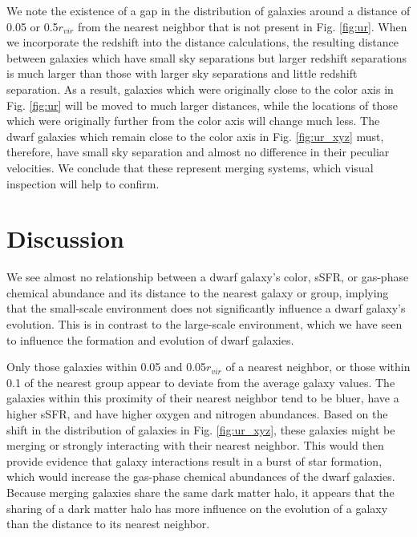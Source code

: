 We note the existence of a gap in the distribution of galaxies around a distance 
of 0.05 \hMpc or 0.5$r_{vir}$ from the nearest neighbor that is not present in 
Fig. \ref{fig:ur}.  When we incorporate the redshift into the distance 
calculations, the resulting distance between galaxies which have small sky 
separations but larger redshift separations is much larger than those with 
larger sky separations and little redshift separation.  As a result, galaxies 
which were originally close to the color axis in Fig. \ref{fig:ur} will be 
moved to much larger distances, while the locations of those which were 
originally further from the color axis will change much less.  The dwarf 
galaxies which remain close to the color axis in Fig. \ref{fig:ur_xyz} must, 
therefore, have small sky separation and almost no difference in their peculiar 
velocities.  We conclude that these represent merging systems, which visual 
inspection will help to confirm.




\section[Discussion]{Discussion}

We see almost no relationship between a dwarf galaxy's color, sSFR, or gas-phase 
chemical abundance and its distance to the nearest galaxy or group, implying 
that the small-scale environment does not significantly influence a dwarf 
galaxy's evolution.  This is in contrast to the large-scale environment, which 
we have seen to influence the formation and evolution of dwarf galaxies.

Only those galaxies within 0.05 \hMpc and 0.05$r_{vir}$ of a nearest neighbor, 
or those within 0.1 \hMpc of the nearest group appear to deviate from the 
average galaxy values.  The galaxies within this proximity of their nearest 
neighbor tend to be bluer, have a higher sSFR, and have higher oxygen and 
nitrogen abundances.  Based on the shift in the distribution of galaxies in Fig. 
\ref{fig:ur_xyz}, these galaxies might be merging or strongly interacting with 
their nearest neighbor.  This would then provide evidence that galaxy 
interactions result in a burst of star formation, which would increase the 
gas-phase chemical abundances of the dwarf galaxies.  Because merging galaxies 
share the same dark matter halo, it appears that the sharing of a dark matter 
halo has more influence on the evolution of a galaxy than the distance to its 
nearest neighbor.

